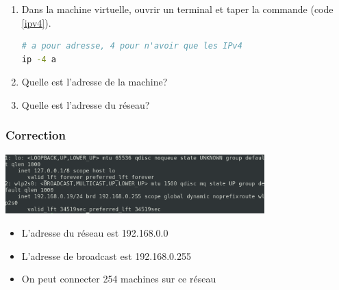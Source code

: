 \documentclass[svgnames,11pt]{beamer}
\begin{document}
\begin{frame}[fragile]
    \frametitle{}

    \begin{activite}
        \begin{enumerate}
            \item Dans la machine virtuelle, ouvrir un terminal et taper la commande (code \ref{ipv4}).
                  \begin{center}
                      \begin{lstlisting}[language=bash , basicstyle=\ttfamily\small, xleftmargin=0em, xrightmargin=-1em]
# a pour adresse, 4 pour n'avoir que les IPv4
ip -4 a
\end{lstlisting}
                      \label{ipv4}
                  \end{center}

            \item Quelle est l'adresse de la machine?
            \item Quelle est l'adresse du réseau?
        \end{enumerate}
    \end{activite}

\end{frame}


\begin{frame}
    \frametitle{Correction}

    \begin{center}
        \centering
        \includegraphics[width=10cm]{ressources/ip.png}
    \end{center}
    \begin{itemize}
        \item L'adresse du réseau est 192.168.0.0
        \item L'adresse de broadcast est 192.168.0.255
        \item On peut connecter 254 machines sur ce réseau
    \end{itemize}
\end{frame}
\end{document}
